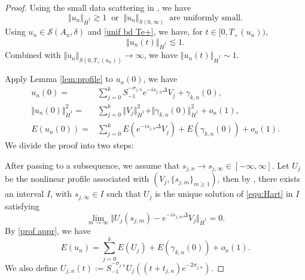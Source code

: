 \documentclass[reqno, 11pt]{amsart}
\numberwithin{equation}{section}
\theoremstyle{plain}
\theoremstyle{definition}
\numberwithin{equation}{section}
\numberwithin{theorem}{section}
\numberwithin{equation}{section}
\numberwithin{equation}{section}
\numberwithin{theorem}{section}
\begin{document}
	\begin{proof}
		Using the small data scattering in \cite[Remark 2.1]{MXZ:crit Hart:f rad}, we have 
		\begin{equation*}
		\Vert u_n\Vert_{\dot H^1}\gtrsim1 \;\;\text{or}\;\;\Vert u_n\Vert_{S(0,\infty)}\;\;\text{are uniformly small}.
		\end{equation*}	
		Using $u_n \in \mathscr{S}(A_n,\delta)$ and \eqref{unif bd Te+}, we have, for $t\in [0,T_+(u_n))$,
		\begin{equation*}
		\Vert u_n(t)\Vert_{\dot H^1}\lesssim 1.
		\end{equation*}
		Combined with $\Vert u_n \Vert_{S(0,T_{+}(u_n))} \to \infty$, we have $\Vert u_n(t)\Vert_{\dot H^1}\sim 1$.
		
		Apply Lemma \ref{lem:profile} to $u_n(0)$, we have
		\begin{equation*}
		\begin{aligned}
		u_n(0)=&\sum_{j=0}^k S_{-1}^{-\sigma_{j,n}}e^{-is_{j,n}\Delta}V_j +\gamma_{k,n}(0),\\ \Vert u_n(0)\Vert_{\dot H^1}^2=&\sum_{j=0}^k \Vert V_j\Vert_{\dot H^1}^2+\Vert \gamma_{k,n}(0)\Vert_{\dot H^1}^2+o_n(1),\\ E(u_n(0))=&\sum_{j=0}^k E(e^{-is_{j,n}\Delta}V_j)+E(\gamma_{k,n}(0))+o_n(1).
		\end{aligned}
		\end{equation*}
		We divide the proof into two steps:
		
		After passing to a subsequence, we assume that $s_{j,n}\rightarrow s_{j,\infty}\in[-\infty,\infty]$. Let $U_j$ be the nonlinear profile associated with $(V_j,\{s_{j,m}\}_{m\geq1})$, then by \cite[Defination 2.2]{MXZ:crit Hart:f rad}, there exists an interval $I$, with $s_{j,\infty}\in I$ such that $U_j$ is the unique solution of \eqref{equ:Hart} in $I$ satisfying
		\begin{equation}\label{prof appr}
		\lim_{m \to \infty}\Vert U_j(s_{j,m})-e^{-is_{j,m}\Delta}V_j \Vert_{\dot H^1}=0.
		\end{equation}
		By \eqref{prof appr}, we have 
		\begin{equation}\label{eorth seq}
		E(u_n)=\sum_{j=0}^{k} E(U_j)+E(\gamma_{k,n}(0))+o_n(1).
		\end{equation}
		We also define $U_{j,n}(t):=S_{-1}^{-\sigma_{j,n}}U_j((t+t_{j,n})e^{-2\sigma_{j,n}})$. 
		

\end{proof}
\end{document}
